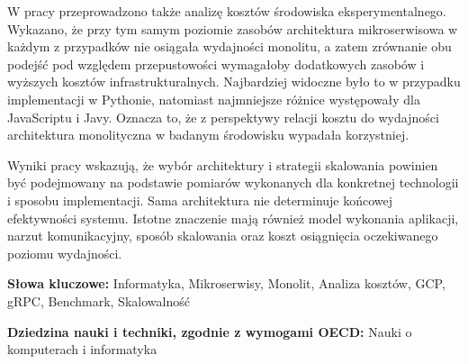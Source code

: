 W pracy przeprowadzono także analizę kosztów środowiska eksperymentalnego. Wykazano, że przy tym samym poziomie zasobów architektura mikroserwisowa w każdym z  przypadków nie osiągała wydajności monolitu, a zatem zrównanie obu podejść pod względem przepustowości wymagałoby dodatkowych zasobów i wyższych kosztów infrastrukturalnych. Najbardziej widoczne było to w przypadku implementacji w Pythonie, natomiast najmniejsze różnice występowały dla JavaScriptu i Javy. Oznacza to, że z perspektywy relacji kosztu do wydajności architektura monolityczna w badanym środowisku wypadała korzystniej.

Wyniki pracy wskazują, że wybór architektury i strategii skalowania powinien być podejmowany na podstawie pomiarów wykonanych dla konkretnej technologii i sposobu implementacji. Sama architektura nie determinuje końcowej efektywności systemu. Istotne znaczenie mają również model wykonania aplikacji, narzut komunikacyjny, sposób skalowania oraz koszt osiągnięcia oczekiwanego poziomu wydajności.

\vspace{0.5cm}

\noindent \textbf{Słowa kluczowe:} Informatyka, Mikroserwisy, Monolit, Analiza kosztów, GCP, gRPC, Benchmark, Skalowalność
\vspace{0.5cm}

\noindent \textbf{Dziedzina nauki i techniki, zgodnie z wymogami OECD:} Nauki o komputerach i informatyka
\vspace{0.5cm}